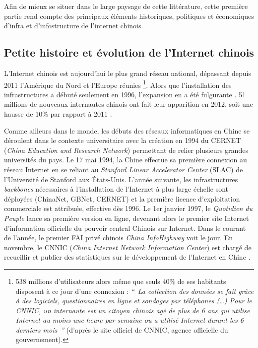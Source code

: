 Afin de mieux se situer dans le large paysage de cette littérature, cette première partie rend compte des principaux éléments historiques, politiques et économiques d’infra et d’infostructure de l’internet chinois.

\subsection[Petite histoire et évolution de l’Internet chinois]{Petite histoire et évolution de l’Internet chinois}

L’Internet chinois est aujourd’hui le plus grand réseau national, dépassant depuis 2011 l’Amérique du Nord et l’Europe réunies \citep{CNNIC2013}\footnote{538 millions d'utilisateurs alors même que seuls 40\% de ses habitants disposent à ce jour d’une connexion : \textit{`` La collection des données se fait grâce à des logiciels, questionnaires en ligne et sondages par téléphones (…) Pour le CNNIC, un internaute est un citoyen chinois agé de plus de 6 ans qui utilise Internet au moins une heure par semaine ou a utilisé Internet durant les 6 derniers mois ''} (d’après le site officiel de CNNIC, agence officielle du gouvernement).}. Alors que l’installation des infrastructures a débuté seulement en 1996, l’expansion en a été fulgurante \citep{Fang2006}. 51 millions de nouveaux internautes chinois ont fait leur apparition en 2012, soit une hausse de 10\% par rapport à 2011 \citep{CNNIC2013}. 

Comme ailleurs dans le monde, les débuts des réseaux informatiques en Chine se déroulent dans le contexte universitaire avec la création en 1994 du CERNET (\textit{China Education and Research Network}) permettant de relier plusieurs grandes universités du pays. Le 17 mai 1994, la Chine effectue sa première connexion au réseau Internet en se reliant au \textit{Stanford Linear Accelerator Center} (SLAC) de l’Université de Stanford aux États-Unis. L’année suivante, les infrastructures \textit{backbones} nécessaires à l’installation de l’Internet à plus large échelle sont déployées (ChinaNet, GBNet, CERNET) et la première licence d’exploitation commerciale est attribuée, effective dès 1996. Le 1er janvier 1997, le \textit{Quotidien du Peuple} lance sa première version en ligne, devenant alors le premier site Internet d’information officielle du pouvoir central Chinois sur Internet. Dans le courant de l’année, le premier FAI privé chinois \textit{China InfoHighway} voit le jour. En novembre, le CNNIC (\textit{China Internet Network Information Center}) est chargé de recueillir et publier des statistiques sur le développement de l’Internet en Chine \citep{Dai2007}.

